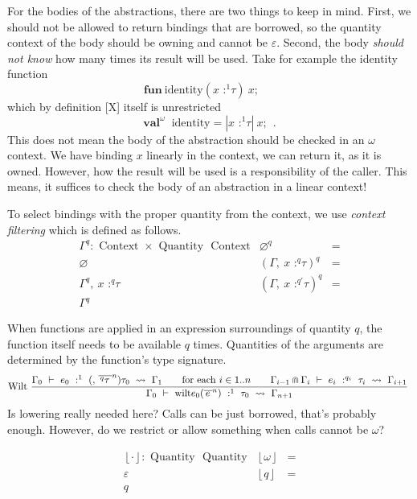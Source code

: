 For the bodies of the abstractions, there are two things to keep in
mind. First, we should not be allowed to return bindings that are
borrowed, so the quantity context of the body should be owning and
cannot be \(\varepsilon\). Second, the body \emph{should not know} how
many times its result will be used. Take for example the identity
function
\[{\mathsf{\mathbf{\text{fun}}}\ \text{identity}({x\text{ :}^{1}\tau})\ x;\ \ }\quad\]
which by definition {[}X{]} itself is unrestricted
\[{\mathsf{\mathbf{\text{val}}}^{\omega}\ \text{ identity} = {|{x\text{ :}^{1}\tau}|\ x};\ \ }.\]
This does not mean the body of the abstraction should be checked in an
\(\omega\) context. We have binding \(x\) linearly in the context, we
can return it, as it is owned. However, how the result will be used is a
responsibility of the caller. This means, it suffices to check the body
of an abstraction in a linear context!

To select bindings with the proper quantity from the context, we use
\emph{context filtering} which is defined as follows.
\[\begin{array}{lll}
{\Gamma^{q}:\text{ Context } \times \text{ Quantity }\text{ Context}} & \varnothing^{q} & = \\
\varnothing & \left( \Gamma{,\ }{x\text{ :}^{q}\tau} \right)^{q} & = \\
\Gamma^{q}{,\ }{x\text{ :}^{q}\tau} & \left( \Gamma{,\ }{x\text{ :}^{q'}\tau} \right)^{q} & = \\
\Gamma^{q}
\end{array}\]

When functions are applied in an expression surroundings of quantity
\(q\), the function itself needs to be available \(q\) times. Quantities
of the arguments are determined by the function's type signature.
\[\text{Wilt}\ \frac{{\Gamma_{0}\  \vdash \ e_{0}\ :^{1}\ {({,\ }{\overline{\,{{}^{q}\tau}\:}}^{n})\tau_{0}}\  \rightsquigarrow \ \Gamma_{1}}\text{\quad\quad}{\text{for each }i \in 1..n}\text{\quad\quad}{\Gamma_{i - 1} \Cap \Gamma_{i}\  \vdash \ e_{i}\ :^{q_{i}}\ \tau_{i}\  \rightsquigarrow \ \Gamma_{i + 1}}}{\Gamma_{0}\  \vdash \ \mathsf{\mathbf{\text{wilt}}}{e_{0}({\overline{\, e\:}}^{n})}\ :^{1}\ \tau_{0}\  \rightsquigarrow \ \Gamma_{n + 1}}\ \]
Is lowering really needed here? Calls can be just borrowed, that's
probably enough. However, do we restrict or allow something when calls
cannot be \(\omega\)?

\[\begin{array}{lll}
{\left\lfloor \cdot \right\rfloor:\text{ Quantity }\text{ Quantity}} & \left\lfloor \omega \right\rfloor & = \\
\varepsilon & \left\lfloor q \right\rfloor & = \\
q
\end{array}\]

